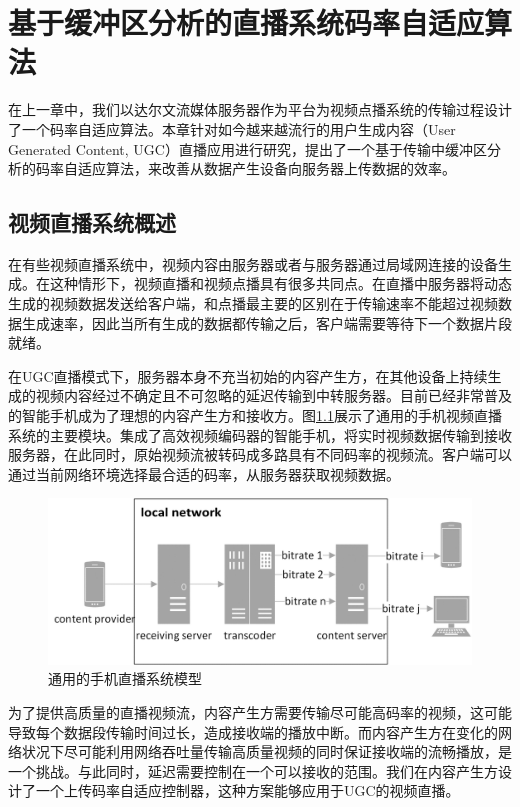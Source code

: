 \chapter{基于缓冲区分析的直播系统码率自适应算法}

在上一章中，我们以达尔文流媒体服务器作为平台为视频点播系统的传输过程设计了一个码率自适应算法。本章针对如今越来越流行的用户生成内容（User Generated Content, UGC）直播应用进行研究，提出了一个基于传输中缓冲区分析的码率自适应算法，来改善从数据产生设备向服务器上传数据的效率。

\section{视频直播系统概述}

在有些视频直播系统中，视频内容由服务器或者与服务器通过局域网连接的设备生成。在这种情形下，视频直播和视频点播具有很多共同点。在直播中服务器将动态生成的视频数据发送给客户端，和点播最主要的区别在于传输速率不能超过视频数据生成速率，因此当所有生成的数据都传输之后，客户端需要等待下一个数据片段就绪\supercite{Thang2014}。

在UGC直播模式下，服务器本身不充当初始的内容产生方，在其他设备上持续生成的视频内容经过不确定且不可忽略的延迟传输到中转服务器。目前已经非常普及的智能手机成为了理想的内容产生方和接收方。图\ref{fig:07}展示了通用的手机视频直播系统的主要模块。集成了高效视频编码器的智能手机，将实时视频数据传输到接收服务器，在此同时，原始视频流被转码成多路具有不同码率的视频流。客户端可以通过当前网络环境选择最合适的码率，从服务器获取视频数据。

\begin{figure}[h]
	\centering
	\includegraphics[width = 0.9\linewidth]{clip/07.png}
	\caption{通用的手机直播系统模型\label{fig:07}}
\end{figure}

为了提供高质量的直播视频流，内容产生方需要传输尽可能高码率的视频，这可能导致每个数据段传输时间过长，造成接收端的播放中断。而内容产生方在变化的网络状况下尽可能利用网络吞吐量传输高质量视频的同时保证接收端的流畅播放，是一个挑战。与此同时，延迟需要控制在一个可以接收的范围。我们在内容产生方设计了一个上传码率自适应控制器，这种方案能够应用于UGC的视频直播。

